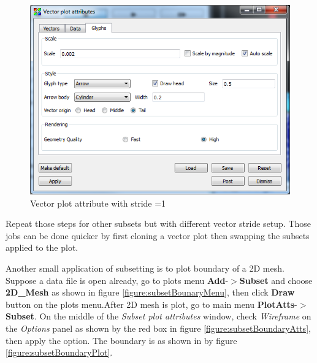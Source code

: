 \documentclass[12pt]{report}
\begin{document}
\begin{figure}
\begin{center}
\includegraphics{denseVectorStyle}
\caption{Vector plot attribute with stride =1 }
\label{figure:denseVectorStyle}
\end{center}
\end{figure} 


Repeat those steps for other subsets but with different vector stride setup. Those jobs can be done quicker by first cloning
a vector plot then swapping the subsets applied to the plot.


Another small application of subsetting is to plot boundary of a 2D mesh. Suppose a data file is open already, go to plots menu {\bf Add}-$>${\bf Subset} and choose {\bf 2D\_Mesh} as shown in figure 
\ref{figure:subsetBounaryMenu}, then click {\bf Draw} button on the plots menu.After 2D mesh is plot, go to main menu {\bf PlotAtts}-$>${\bf Subset}. On the middle of the \emph{Subset plot attributes} window,
check \emph{Wireframe} on the \emph{Options} panel as shown by the red box in figure 
\ref{figure:subsetBoundaryAtts}, then apply the option.  The boundary is as shown in by figure 
\ref{figure:subsetBoundaryPlot}.
\end{document}
